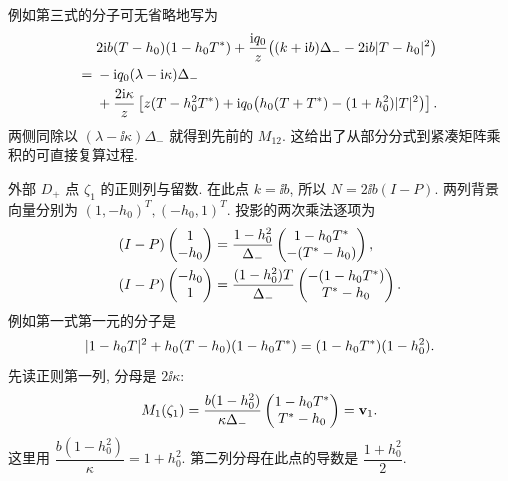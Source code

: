 例如第三式的分子可无省略地写为
\begin{equation*}
\begin{aligned}
&2\mathrm{i} b(T-h_0)(1-h_0{T}^{*})
+\dfrac{\mathrm{i} q_0}{z}
\bigl((k+\mathrm{i} b)\Delta_--2\mathrm{i} b|T-h_0|^2\bigr)\\
={}&-\mathrm{i} q_0(\lambda-\mathrm{i}\kappa)\Delta_-\\
&+\dfrac{2\mathrm{i}\kappa}{z}
\left[
z(T-h_0^2{T}^{*})
+\mathrm{i} q_0\bigl(h_0(T+{T}^{*})-(1+h_0^2)|T|^2\bigr)
\right].
\end{aligned}
\end{equation*}
两侧同除以 $(\lambda-\ii\kappa)\Delta_-$ 就得到先前的 $M_{12}$.
这给出了从部分分式到紧凑矩阵乘积的可直接复算过程.

\par\smallskip\noindent 外部 $D_+$ 点 $\zeta_1$ 的正则列与留数.\quad
在此点 $k=\ii b$, 所以 $N=2\ii b(I-P)$.
两列背景向量分别为 $(1,-h_0)^T,(-h_0,1)^T$.
投影的两次乘法逐项为
\begin{equation*}
\begin{aligned}
(I-P)\begin{pmatrix}1\\-h_0\end{pmatrix}
&=\dfrac{1-h_0^2}{\Delta_-}
\begin{pmatrix}1-h_0{T}^{*}\\-({T}^{*}-h_0)\end{pmatrix},\\
(I-P)\begin{pmatrix}-h_0\\1\end{pmatrix}
&=\dfrac{(1-h_0^2)T}{\Delta_-}
\begin{pmatrix}-(1-h_0{T}^{*})\\{T}^{*}-h_0\end{pmatrix}.
\end{aligned}
\end{equation*}
例如第一式第一元的分子是
\begin{equation*}
|1-h_0T|^2+h_0(T-h_0)(1-h_0{T}^{*})
=(1-h_0{T}^{*})(1-h_0^2).
\end{equation*}
先读正则第一列, 分母是 $2\ii\kappa$:
\begin{equation*}
M_1(\zeta_1)
=\dfrac{b(1-h_0^2)}{\kappa\Delta_-}
\begin{pmatrix}1-h_0{T}^{*}\\{T}^{*}-h_0\end{pmatrix}
=\mathbf v_1.
\end{equation*}
这里用 $\dfrac{b(1-h_0^2)}{\kappa}=1+h_0^2$.
第二列分母在此点的导数是 $\dfrac{1+h_0^2}{2}$.
